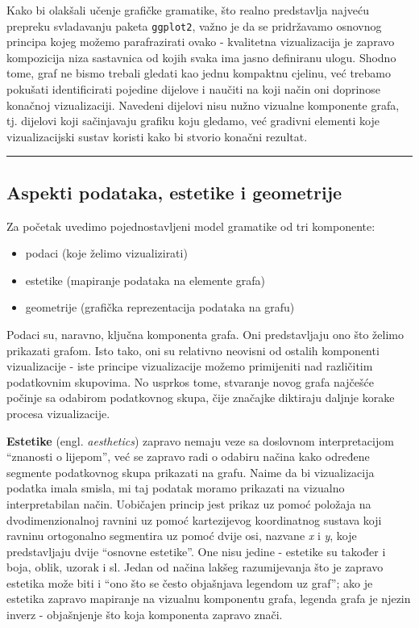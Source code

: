 \documentclass[]{book}
\providecommand{\tightlist}{%
  \setlength{\itemsep}{0pt}\setlength{\parskip}{0pt}}
\theoremstyle{definition}
\theoremstyle{definition}
\theoremstyle{definition}
\theoremstyle{remark}
\begin{document}
Kako bi olakšali učenje grafičke gramatike, što realno predstavlja
najveću prepreku svladavanju paketa \texttt{ggplot2}, važno je da se
pridržavamo osnovnog principa kojeg možemo parafrazirati ovako -
kvalitetna vizualizacija je zapravo kompozicija niza sastavnica od kojih
svaka ima jasno definiranu ulogu. Shodno tome, graf ne bismo trebali
gledati kao jednu kompaktnu cjelinu, već trebamo pokušati identificirati
pojedine dijelove i naučiti na koji način oni doprinose konačnoj
vizualizaciji. Navedeni dijelovi nisu nužno vizualne komponente grafa,
tj. dijelovi koji sačinjavaju grafiku koju gledamo, već gradivni
elementi koje vizualizacijski sustav koristi kako bi stvorio konačni
rezultat.

\begin{center}\rule{0.5\linewidth}{\linethickness}\end{center}

\subsection{Aspekti podataka, estetike i
geometrije}\label{aspekti-podataka-estetike-i-geometrije}

Za početak uvedimo pojednostavljeni model gramatike od tri komponente:

\begin{itemize}
\tightlist
\item
  podaci (koje želimo vizualizirati)
\item
  estetike (mapiranje podataka na elemente grafa)
\item
  geometrije (grafička reprezentacija podataka na grafu)
\end{itemize}

Podaci su, naravno, ključna komponenta grafa. Oni predstavljaju ono što
želimo prikazati grafom. Isto tako, oni su relativno neovisni od ostalih
komponenti vizualizacije - iste principe vizualizacije možemo
primijeniti nad različitim podatkovnim skupovima. No usprkos tome,
stvaranje novog grafa najčešće počinje sa odabirom podatkovnog skupa,
čije značajke diktiraju daljnje korake procesa vizualizacije.

\textbf{Estetike} (engl. \emph{aesthetics}) zapravo nemaju veze sa
doslovnom interpretacijom ``znanosti o lijepom'', već se zapravo radi o
odabiru načina kako određene segmente podatkovnog skupa prikazati na
grafu. Naime da bi vizualizacija podatka imala smisla, mi taj podatak
moramo prikazati na vizualno interpretabilan način. Uobičajen princip
jest prikaz uz pomoć položaja na dvodimenzionalnoj ravnini uz pomoć
kartezijevog koordinatnog sustava koji ravninu ortogonalno segmentira uz
pomoć dvije osi, nazvane \emph{x} i \emph{y}, koje predstavljaju dvije
``osnovne estetike''. One nisu jedine - estetike su također i boja,
oblik, uzorak i sl. Jedan od načina lakšeg razumijevanja što je zapravo
estetika može biti i ``ono što se često objašnjava legendom uz graf'';
ako je estetika zapravo mapiranje na vizualnu komponentu grafa, legenda
grafa je njezin inverz - objašnjenje što koja komponenta zapravo znači.
\end{document}
